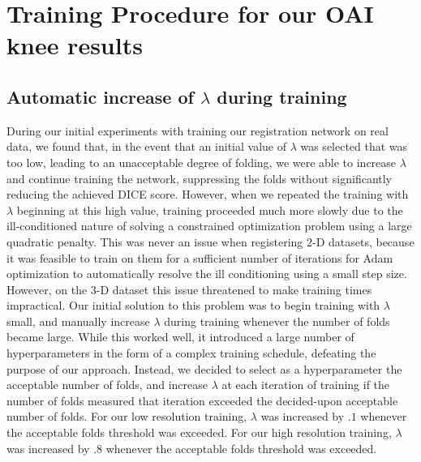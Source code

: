 \documentclass[10pt,onecolumn,letterpaper]{article} %
\begin{document}
\section{Training Procedure for our OAI knee results}

\subsection{Automatic increase of $\lambda$ during training}
During our initial experiments with training our registration network on real data, we found that, in the event that an initial value of $\lambda$ was selected that was too low, leading to an unacceptable degree of folding, we were able to increase $\lambda$ and continue training the network, suppressing the folds without significantly reducing the achieved DICE score. However, when we repeated the training with $\lambda$ beginning at this high value, training proceeded much more slowly due to the ill-conditioned nature of solving a constrained optimization problem using a large quadratic penalty. This was never an issue when registering 2-D datasets, because it was feasible to train on them for a sufficient number of iterations for Adam optimization to automatically resolve the ill conditioning using a small step size. However, on the 3-D dataset this issue threatened to make training times impractical.  Our initial solution to this problem was to begin training with $\lambda$ small, and manually increase $\lambda$ during training whenever the number of folds became large. While this worked well, it introduced a large number of hyperparameters in the form of a complex training schedule, defeating the purpose of our approach. Instead, we decided to select as a hyperparameter the acceptable number of folds, and increase $\lambda$ at each iteration of training if the number of folds measured that iteration exceeded the decided-upon acceptable number of folds. For our low resolution training, $\lambda$ was increased by $.1$ whenever the acceptable folds threshold was exceeded. For our high resolution training, $\lambda$ was increased by $.8$ whenever the acceptable folds threshold was exceeded.
\end{document}
